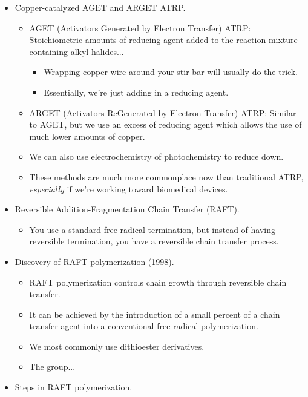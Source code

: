 \documentclass[../notes.tex]{subfiles}
\begin{document}
\begin{itemize}
\begin{itemize}
    \end{itemize}
    \item Copper-catalyzed AGET and ARGET ATRP.
    \begin{itemize}
        \item AGET (Activators Generated by Electron Transfer) ATRP: Stoichiometric amounts of reducing agent added to the reaction mixture containing alkyl halides...
        \begin{itemize}
            \item Wrapping copper wire around your stir bar will usually do the trick.
            \item Essentially, we're just adding in a reducing agent.
        \end{itemize}
        \item ARGET (Activators ReGenerated by Electron Transfer) ATRP: Similar to AGET, but we use an excess of reducing agent which allows the use of much lower amounts of copper.
        \item We can also use electrochemistry of photochemistry to reduce down.
        \item These methods are much more commonplace now than traditional ATRP, \emph{especially} if we're working toward biomedical devices.
    \end{itemize}
    \item Reversible Addition-Fragmentation Chain Transfer (RAFT).
    \begin{itemize}
        \item You use a standard free radical termination, but instead of having reversible termination, you have a reversible chain transfer process.
    \end{itemize}
    \item Discovery of RAFT polymerization (1998).
    \begin{itemize}
        \item RAFT polymerization controls chain growth through reversible chain transfer.
        \item It can be achieved by the introduction of a small percent of a chain transfer agent into a conventional free-radical polymerization.
        \item We most commonly use dithioester derivatives.
        \item The  group...
    \end{itemize}
    \item Steps in RAFT polymerization.
    \begin{itemize}

\end{itemize}
\end{itemize}
\end{document}
